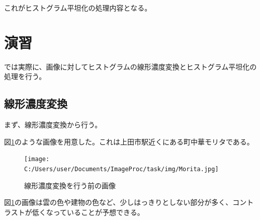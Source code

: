 \documentclass[a4paper,11pt,dvipdfmx]{jsarticle}
\begin{document}
これがヒストグラム平坦化の処理内容となる。

\section{演習}
では実際に、画像に対してヒストグラムの線形濃度変換とヒストグラム平坦化の処理を行う。

\subsection{線形濃度変換}
まず、線形濃度変換から行う。

図\ref{Morita}のような画像を用意した。これは上田市駅近くにある町中華モリタである。
\begin{figure}[htbp]
    \centering
    \texttt{[image: C:/Users/user/Documents/ImageProc/task/img/Morita.jpg]}
    \caption{線形濃度変換を行う前の画像}
    \label{Morita}
\end{figure}

図\ref{Morita}の画像は雲の色や建物の色など、少しはっきりとしない部分が多く、コントラストが低くなっていることが予想できる。
\end{document}
